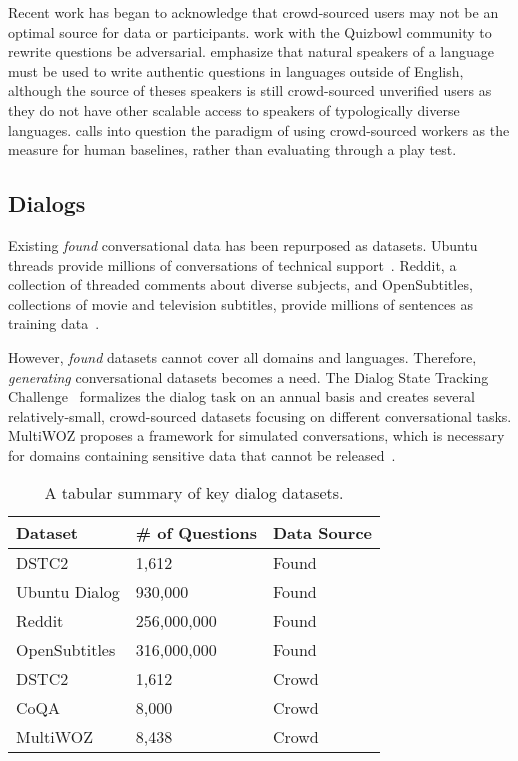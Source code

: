 Recent work has began to acknowledge that crowd-sourced users may not be an optimal source for data or participants.
%
\citet{wallace2019trick} work with the Quizbowl community to rewrite questions be adversarial.  
%
\citet{clark2020tydi} emphasize that natural speakers of a language must be used to write authentic questions in languages outside of English, although the source of theses speakers is still crowd-sourced unverified users as they do not have other scalable access to speakers of typologically diverse languages.
%
\citet{boyd2020question} calls into question the paradigm of using crowd-sourced workers as the measure for human baselines, rather than evaluating through a play test.  



\subsection{Dialogs}
\label{sec:dialog}

%

Existing \textit{found} conversational data has been repurposed as \nlp{} datasets.  Ubuntu threads provide millions of conversations of technical support~\citep{lowe2015ubuntu}.  Reddit, a collection of threaded comments about diverse subjects, and OpenSubtitles, collections of movie and television subtitles, provide millions of sentences as training data~\citep{henderson2019datasets}.

However, \textit{found} datasets cannot cover all domains and languages.  
%
Therefore, \textit{generating} conversational datasets becomes a \nlp{} need.
%
The Dialog State Tracking Challenge~\citep{henderson-etal-2014-second} formalizes the dialog task on an annual basis and creates several relatively-small, crowd-sourced datasets focusing on different conversational tasks.    
%
MultiWOZ proposes a framework for simulated conversations, which is necessary for domains containing sensitive data that cannot be released~\citep{budzianowski2018multiwoz}.


\begin{table}
	\centering{}
	\begin{tabular}{l l l}
		\textbf{Dataset} &	\textbf{\# of Questions} & \textbf{Data Source}\\
		\hline
		DSTC2 & 1,612 & Found \\
		Ubuntu Dialog & 930,000 & Found \\
		Reddit & 256,000,000 & Found \\
		OpenSubtitles & 316,000,000 & Found \\
		DSTC2 & 1,612 & Crowd \\
		CoQA  & 8,000 & Crowd \\
		MultiWOZ & 8,438 & Crowd \\	
		
	\end{tabular}
	\caption{A tabular summary of key dialog datasets.}
	\label{tab:qa}
\end{table}




